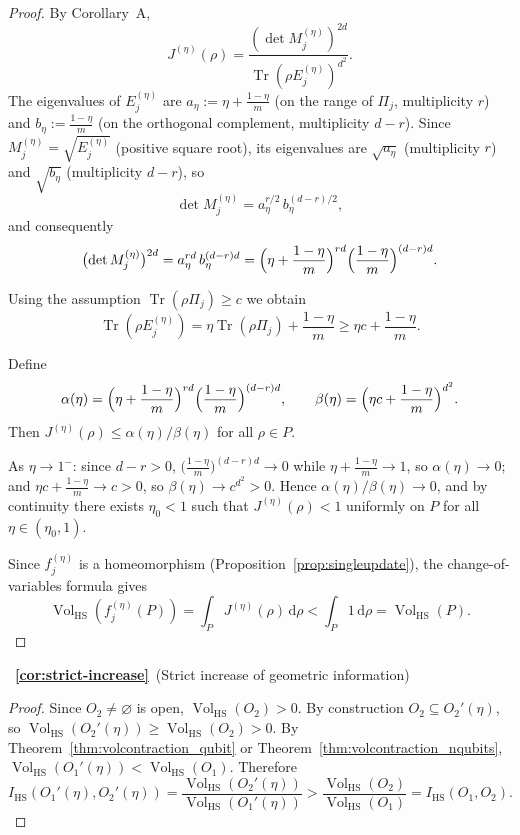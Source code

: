 \documentclass[11pt, onecolumn]{article}
\begin{document}
\begin{proof}
By Corollary~A,
\[
J^{(\eta)}(\rho)=\frac{(\det M_j^{(\eta)})^{2d}}{\operatorname{Tr}(\rho E_j^{(\eta)})^{d^2}}.
\]
The eigenvalues of \(E_j^{(\eta)}\) are \(a_\eta:=\eta+\frac{1-\eta}{m}\) (on the range of \(\Pi_j\),
multiplicity \(r\)) and \(b_\eta:=\frac{1-\eta}{m}\) (on the orthogonal complement, multiplicity
\(d-r\)). Since \(M_j^{(\eta)}=\sqrt{E_j^{(\eta)}}\) (positive square root), its eigenvalues
are \(\sqrt{a_\eta}\) (multiplicity \(r\)) and \(\sqrt{b_\eta}\) (multiplicity \(d-r\)), so
\[
\det M_j^{(\eta)} = a_\eta^{r/2}\,b_\eta^{(d-r)/2},
\]
and consequently
\[
\bigl(\det M_j^{(\eta)}\bigr)^{2d}
      = a_\eta^{rd}\,b_\eta^{(d-r)d}
      = \Bigl(\eta+\frac{1-\eta}{m}\Bigr)^{rd}
        \Bigl(\frac{1-\eta}{m}\Bigr)^{(d-r)d}.
\]

Using the assumption \(\operatorname{Tr}(\rho\Pi_j)\ge c\) we obtain
\[
\operatorname{Tr}(\rho E_j^{(\eta)}) = \eta\operatorname{Tr}(\rho\Pi_j)+\frac{1-\eta}{m}
                       \ge \eta c + \frac{1-\eta}{m}.
\]

Define
\[
\alpha(\eta)=\Bigl(\eta+\frac{1-\eta}{m}\Bigr)^{rd}
              \Bigl(\frac{1-\eta}{m}\Bigr)^{(d-r)d},
\qquad
\beta(\eta)=\Bigl(\eta c + \frac{1-\eta}{m}\Bigr)^{d^2}.
\]
Then $J^{(\eta)}(\rho) \le \alpha(\eta)/\beta(\eta)$ for all $\rho\in P$.

As \(\eta\to1^-\): since \(d-r>0\), \(\bigl(\frac{1-\eta}{m}\bigr)^{(d-r)d}\to0\) while \(\eta+\frac{1-\eta}{m}\to1\), so \(\alpha(\eta)\to0\); and \(\eta c+\frac{1-\eta}{m}\to c>0\), so \(\beta(\eta)\to c^{d^2}>0\). Hence \(\alpha(\eta)/\beta(\eta)\to0\), and by continuity there exists \(\eta_0<1\) such that \(J^{(\eta)}(\rho)<1\) uniformly on \(P\) for all \(\eta\in(\eta_0,1)\).

Since $f_j^{(\eta)}$ is a homeomorphism (Proposition~\ref{prop:singleupdate}), the change-of-variables formula gives
\[
\operatorname{Vol}_{\mathrm{HS}}\!\left(f_j^{(\eta)}(P)\right)
= \int_P J^{(\eta)}(\rho) \, \mathrm{d}\rho
< \int_P 1 \, \mathrm{d}\rho
= \operatorname{Vol}_{\mathrm{HS}}(P).
\]
\end{proof}

~{\bf \ref{cor:strict-increase}}~(Strict increase of geometric information)

\begin{proof}
Since $O_2\neq\varnothing$ is open, $\operatorname{Vol}_{\mathrm{HS}}(O_2)>0$. By construction $O_2\subseteq O_2'(\eta)$, so $\operatorname{Vol}_{\mathrm{HS}}(O_2'(\eta))\ge\operatorname{Vol}_{\mathrm{HS}}(O_2)>0$. By Theorem~\ref{thm:volcontraction_qubit} or Theorem~\ref{thm:volcontraction_nqubits}, $\operatorname{Vol}_{\mathrm{HS}}(O_1'(\eta))<\operatorname{Vol}_{\mathrm{HS}}(O_1)$. Therefore
\[
I_{\mathrm{HS}}(O_1'(\eta),O_2'(\eta))
=\frac{\operatorname{Vol}_{\mathrm{HS}}(O_2'(\eta))}{\operatorname{Vol}_{\mathrm{HS}}(O_1'(\eta))}
>\frac{\operatorname{Vol}_{\mathrm{HS}}(O_2)}{\operatorname{Vol}_{\mathrm{HS}}(O_1)}
=I_{\mathrm{HS}}(O_1,O_2).
\]
\end{proof}
\end{document}
